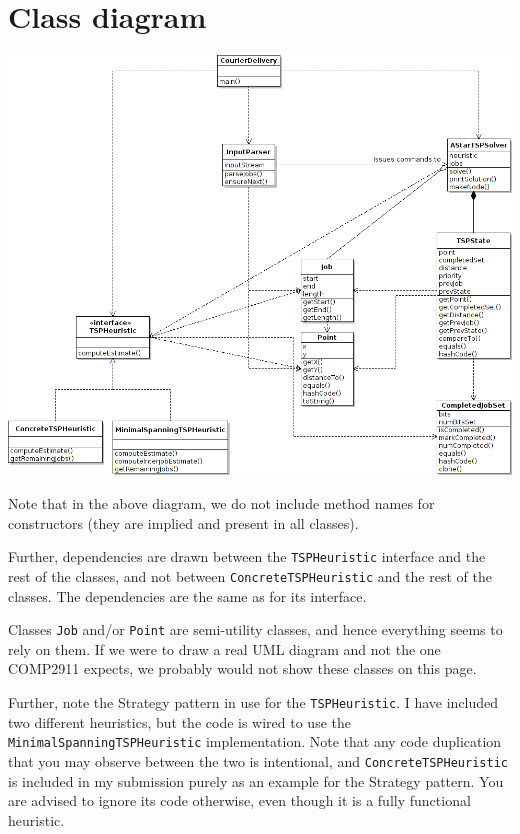 \documentclass[a4paper,11pt]{article}
\begin{document}
\section*{Class diagram}

\includegraphics[scale=0.5]{uml.png}
\vspace{5mm}

Note that in the above diagram, we do not include method names for constructors
(they are implied and present in all classes).

Further, dependencies are drawn between the \texttt{TSPHeuristic} interface and
the rest of the classes, and not between \texttt{ConcreteTSPHeuristic} and the
rest of the classes. The dependencies are the same as for its interface.

Classes \texttt{Job} and/or \texttt{Point} are semi-utility classes, and hence
everything seems to rely on them. If we were to draw a real UML diagram and not
the one COMP2911 expects, we probably would not show these classes on this page.

Further, note the Strategy pattern in use for the \texttt{TSPHeuristic}.
I have included two different heuristics, but the code is wired to use the
\texttt{MinimalSpanningTSPHeuristic} implementation.
Note that any code duplication that you may observe between the two is
intentional, and \texttt{ConcreteTSPHeuristic} is included in my submission
purely as an example for the Strategy pattern.
You are advised to ignore its code otherwise, even though it is a fully
functional heuristic.
\end{document}
